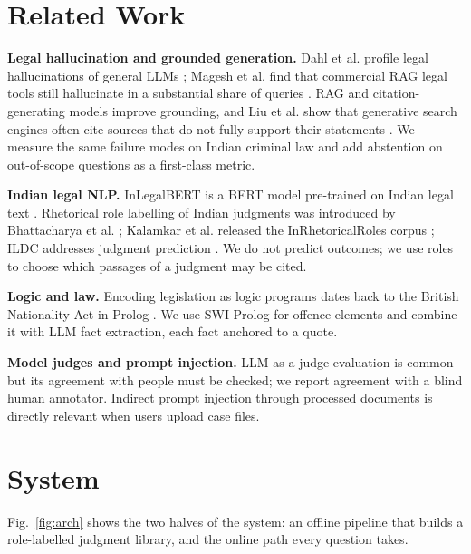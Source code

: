 \documentclass[conference]{IEEEtran}
\begin{document}
\section{Related Work}

\textbf{Legal hallucination and grounded generation.} Dahl et al. profile legal hallucinations of
general LLMs \cite{dahl2024fictions}; Magesh et al. find that commercial RAG legal tools still
hallucinate in a substantial share of queries \cite{magesh2025hallucination}. RAG \cite{lewis2020rag}
and citation-generating models \cite{gao2023citations} improve grounding, and Liu et al. show that
generative search engines often cite sources that do not fully support their statements
\cite{liu2023verifiability}. We measure the same failure modes on Indian criminal law and add
abstention on out-of-scope questions as a first-class metric.

\textbf{Indian legal NLP.} InLegalBERT is a BERT model pre-trained on Indian legal text
\cite{paul2023inlegalbert}. Rhetorical role labelling of Indian judgments was introduced by
Bhattacharya et al. \cite{bhattacharya2019roles}; Kalamkar et al. released the InRhetoricalRoles
corpus \cite{kalamkar2022corpus}; ILDC addresses judgment prediction \cite{malik2021ildc}. We do not
predict outcomes; we use roles to choose which passages of a judgment may be cited.

\textbf{Logic and law.} Encoding legislation as logic programs dates back to the British Nationality
Act in Prolog \cite{sergot1986bna}. We use SWI-Prolog \cite{wielemaker2012swi} for offence elements and
combine it with LLM fact extraction, each fact anchored to a quote.

\textbf{Model judges and prompt injection.} LLM-as-a-judge evaluation \cite{zheng2023judge} is common
but its agreement with people must be checked; we report agreement with a blind human annotator.
Indirect prompt injection through processed documents \cite{greshake2023injection} is directly
relevant when users upload case files.

\section{System}\label{sec:system}

Fig.~\ref{fig:arch} shows the two halves of the system: an offline pipeline that builds a
role-labelled judgment library, and the online path every question takes.
\end{document}
